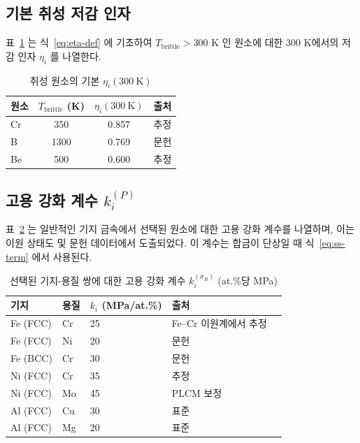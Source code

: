 \documentclass[12pt,a4paper]{article}
\begin{document}
	\subsection{기본 취성 저감 인자}
	\label{subsec:eta-table}
	표~\ref{tab:eta} 는 식~\ref{eq:eta-def} 에 기초하여 $T_{\text{brittle}} > 300$ K 인 원소에 대한 300 K에서의 저감 인자 $\eta_i$ 를 나열한다.
	
	\begin{table}[htbp]
		\centering
		\caption{취성 원소의 기본 $\eta_i(300\ \mathrm{K})$}
		\label{tab:eta}
		\begin{tabular}{lccc}
			\toprule
			\textbf{원소} & $T_{\text{brittle}}$ (K) & $\eta_i(300\ \mathrm{K})$ & \textbf{출처} \\
			\midrule
			Cr & 350 & 0.857 & 추정 \\
			B  & 1300 & 0.769 & 문헌 \\
			Be & 500 & 0.600 & 추정 \\
			\bottomrule
		\end{tabular}
	\end{table}
	
	\subsection{고용 강화 계수 $k_i^{(P)}$}
	\label{subsec:kss}
	
	표~\ref{tab:kss} 는 일반적인 기지 금속에서 선택된 원소에 대한 고용 강화 계수를 나열하며, 이는 이원 상태도 및 문헌 데이터에서 도출되었다. 이 계수는 합금이 단상일 때 식~\ref{eq:ss-term} 에서 사용된다.
	
	\begin{longtable}{p{2cm} p{2cm} p{2cm} p{2cm} p{2cm}}
		\caption{선택된 기지-용질 쌍에 대한 고용 강화 계수 $k_i^{(\sigma_B)}$ (at.\%당 MPa)}\label{tab:kss}\\
		\toprule
		\textbf{기지} & \textbf{용질} & $k_i$ (MPa/at.\%) & \textbf{출처} \\
		\midrule
		Fe (FCC) & Cr & 25 & Fe–Cr 이원계에서 추정 \\
		Fe (FCC) & Ni & 20 & 문헌 \\
		Fe (BCC) & Cr & 30 & 문헌 \\
		Ni (FCC) & Cr & 35 & 추정 \\
		Ni (FCC) & Mo & 45 & PLCM 보정 \\
		Al (FCC) & Cu & 30 & 표준 \\
		Al (FCC) & Mg & 20 & 표준 \\
		\bottomrule
	\end{longtable}
	
\end{document}

